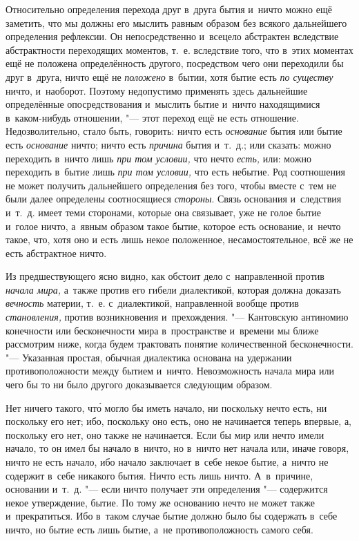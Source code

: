Относительно определения перехода друг в~друга бытия и~ничто можно ещё
заметить, что мы должны его мыслить равным образом без всякого дальнейшего
определения рефлексии. Он непосредственно и~всецело абстрактен вследствие
абстрактности переходящих моментов, т.~е. вследствие того, что в~этих моментах
ещё не положена определённость другого, посредством чего они переходили бы друг
в~друга, ничто ещё не {\em положено} в~бытии, хотя бытие есть {\em по существу}
ничто, и~наоборот. Поэтому недопустимо применять здесь дальнейшие определённые
опосредствования и~мыслить бытие и~ничто находящимися в~каком-нибудь отношении,
"--- этот переход ещё не есть отношение. Недозволительно, стало быть, говорить:
ничто есть {\em основание} бытия или бытие есть {\em основание} ничто; ничто
есть {\em причина} бытия и~т.~д.; или сказать: можно переходить в~ничто лишь
{\em при том условии,} что нечто {\em есть,} или: можно переходить в~бытие лишь
{\em при том условии,} что есть небытие. Род соотношения не может получить
дальнейшего определения без того, чтобы вместе с~тем не были далее определены
соотносящиеся {\em стороны}. Связь основания и~следствия и~т.~д. имеет теми
сторонами, которые она связывает, уже не голое бытие и~голое ничто, а~явным
образом такое бытие, которое есть основание, и~нечто такое, что, хотя оно и
есть лишь некое положенное, несамостоятельное, всё же не есть
абстрактное ничто.


Из предшествующего ясно видно, как обстоит дело с~направленной против
{\em начала мира,} а~также против его гибели диалектикой, которая должна
доказать {\em вечность} материи, т.~е. с~диалектикой, направленной вообще
против {\em становления,} против возникновения и~прехождения. "--- Кантовскую
антиномию конечности или бесконечности мира в~пространстве и~времени мы ближе
рассмотрим ниже, когда будем трактовать понятие количественной бесконечности.
"--- Указанная простая, обычная диалектика основана на удержании
противоположности между бытием и~ничто. Невозможность начала мира или чего бы
то ни было другого доказывается следующим образом.

Нет ничего такого, чт\'{о} могло бы иметь начало, ни поскольку нечто есть, ни
поскольку его нет; ибо, поскольку оно есть, оно не начинается теперь впервые,
а, поскольку его нет, оно также не начинается. Если бы мир или нечто имели
начало, то он имел бы начало в~ничто, но в~ничто нет начала или, иначе говоря,
ничто не есть начало, ибо начало заключает в~себе некое бытие, а~ничто не
содержит в~себе никакого бытия. Ничто есть лишь ничто. А~в~причине, основании
и~т.~д. "--- если ничто получает эти определения "--- содержится некое
утверждение, бытие. По тому же основанию нечто не может также и~прекратиться.
Ибо в~таком случае бытие должно было бы содержать в~себе ничто, но бытие есть
лишь бытие, а~не противоположность самого себя.

